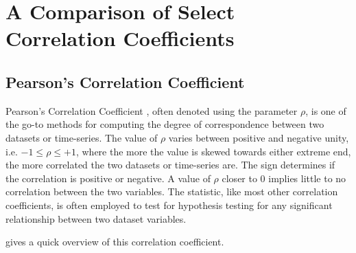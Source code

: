 \section{A Comparison of Select Correlation Coefficients}

\subsection*{Pearson's Correlation Coefficient}

Pearson's Correlation Coefficient \cite{pearsonCorrCoeff}, often denoted using the parameter $\rho$, is one of the go-to methods for computing the degree of correspondence between two datasets or time-series. The value of $\rho$ varies between positive and negative unity, i.e. $-1 \leq \rho \leq +1$, where the more the value is skewed towards either extreme end, the more correlated the two datasets or time-series are. The sign determines if the correlation is positive or negative. A value of $\rho$ closer to $0$ implies little to no correlation between the two variables. The statistic, like most other correlation coefficients, is often employed to test for hypothesis testing for any significant relationship between two dataset variables.

 gives a quick overview of this correlation coefficient.

